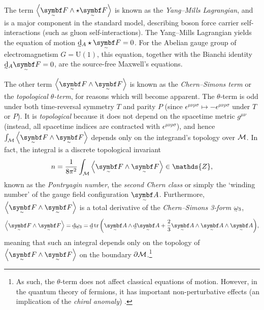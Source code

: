 The term $\angbr{\tsbm F \wedge\star \tsbm F}$ is known as the \emph{Yang--Mills Lagrangian}, and is a major component in the standard model, describing boson force carrier self-interactions (such as gluon self-interactions).
The Yang--Mills Lagrangian yields the equation of motion $\ts\dd_A\star\tsbm F = 0$.
For the Abelian gauge group of electromagnetism $G = \mathrm{U}(1)$, this equation, together with the Bianchi identity $\ts\dd_A\tsbm F = 0$, are the source-free Maxwell's equations.


The other term $\angbr{\tsbm F \wedge \tsbm F}$ is known as the \emph{Chern--Simons term} or the \emph{topological $θ$-term}, for reasons which will become apparent.
The $θ$-term is odd under both time-reversal symmetry $T$ and parity $P$ (since $\epsilon^{μν\rho\sigma} \mapsto -\epsilon^{μν\rho\sigma}$ under $T$ or $P$).
It is \emph{topological} because it does not depend on the spacetime metric $g^{μν}$ (instead, all spacetime indices are contracted with $\epsilon^{μν\rho\sigma}$), and hence $\int_{\cal M} \angbr{\tsbm F \wedge \tsbm F}$ depends only on the integrand's topology over $\cal M$.
In fact, the integral is a discrete topological invariant
\begin{align}
	n = \frac{1}{8\pi^2}\int_{\cal M} \angbr{\tsbm F \wedge \tsbm F} \in \mathds{Z}
,\end{align}
known as the \emph{Pontryagin number}, the \emph{second Chern class} \cite[§\,1]{Witten_1989} or simply the `winding number' \cite[§\,2.2]{Tong_lecture_notes} of the gauge field configuration $\tsbm A$.
Furthermore, $\angbr{\tsbm F \wedge \tsbm F}$ is a total derivative of the \emph{Chern--Simons 3-form} $\csform$,
\begin{align}
	\angbr{\tsbm F \wedge \tsbm F}
	= \ts\dd\csform
	= \ts\dd\tr\qty(\tsbm A\wedge\ts\dd\tsbm A + \frac{2}{3}\tsbm A\wedge\tsbm A\wedge\tsbm A)
,\end{align}
meaning that such an integral depends only on the topology of $\angbr{\tsbm F \wedge \tsbm F}$ on the boundary $\partial\cal M$.\footnote{
	As such, the $θ$-term does not affect classical equations of motion.
	However, in the quantum theory of fermions, it has important non-perturbative effects (an implication of the \emph{chiral anomaly}) \cite[§\,3]{Tong_lecture_notes}.
}


